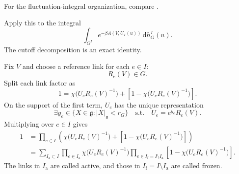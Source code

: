 \documentclass[10pt,reqno]{amsart}
\theoremstyle{definition}
\theoremstyle{remark}
\numberwithin{equation}{section}
\numberwithin{figure}{section}
\newcommand{\g}{\mathfrak g}
\newcommand{\dd}{\mathrm d}
\newcommand{\Ia}{I_{\mathrm a}}
\newcommand{\If}{I_{\mathrm f}}
\begin{document}
For the fluctuation-integral organization, compare \cite[Section~2, pp.~265--268]{Bal87}.

Apply this to the integral
\begin{equation}\label{eq:display-084}
\int_{G^I}e^{-\beta A(V,U_T(u))}\,\dd h_G^I(u).
\end{equation}
The cutoff decomposition is an exact identity.

Fix $V$ and choose a reference link for each $e\in I$:
\begin{equation}\label{eq:display-085}
R_e(V)\in G.
\end{equation}
Split each link factor as
\begin{equation}\label{eq:display-086}
1=\chi\bigl(U_eR_e(V)^{-1}\bigr)
+\left[1-\chi\bigl(U_eR_e(V)^{-1}\bigr)\right].
\end{equation}
On the support of the first term, $U_e$ has the unique representation
\begin{equation}\label{eq:display-087}
\exists y_e\in\{X\in\g:|X|_\g<r_G\}\quad\text{s.t.}\quad U_e=e^{y_e}R_e(V).
\end{equation}
Multiplying over $e\in I$ gives
\begin{equation}\label{eq:display-088}
\begin{aligned}
1&=\prod_{e\in I}\left(\chi\bigl(U_eR_e(V)^{-1}\bigr)
+\left[1-\chi\bigl(U_eR_e(V)^{-1}\bigr)\right]\right)\\
&=\sum_{\Ia\subset I}
\prod_{e\in\Ia}\chi\bigl(U_eR_e(V)^{-1}\bigr)
\prod_{e\in\If=I\setminus\Ia}\left[1-\chi\bigl(U_eR_e(V)^{-1}\bigr)\right].
\end{aligned}
\end{equation}
The links in $\Ia$ are called active, and those in $\If=I\setminus\Ia$ are called frozen.
\end{document}

